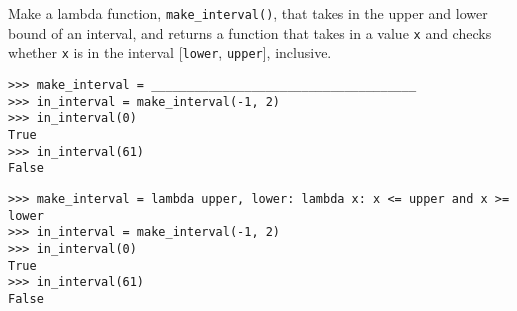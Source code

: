 \begin{blocksection}
\question Make a lambda function, \lstinline$make_interval()$, that takes in the upper and lower bound of an interval, and returns a function that takes in a value \lstinline$x$ and checks whether \lstinline$x$ is in the interval [\lstinline$lower$, \lstinline$upper$], inclusive.

\begin{lstlisting}
>>> make_interval = _____________________________________
>>> in_interval = make_interval(-1, 2)
>>> in_interval(0)
True
>>> in_interval(61)
False

\end{lstlisting}

\begin{solution}[1in]
\begin{lstlisting}
>>> make_interval = lambda upper, lower: lambda x: x <= upper and x >= lower
>>> in_interval = make_interval(-1, 2)
>>> in_interval(0)
True
>>> in_interval(61)
False

\end{lstlisting}
\end{solution}
\end{blocksection}
